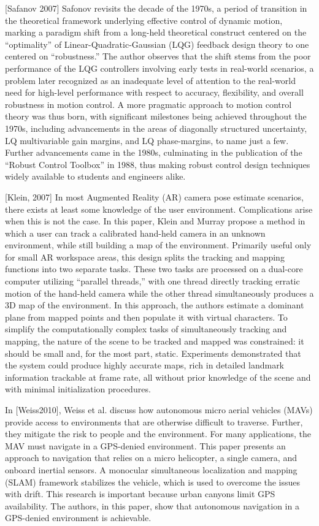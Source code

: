 [Safanov 2007] Safonov revisits the decade of the 1970s, a period of transition in the theoretical framework underlying effective control of dynamic motion, marking a paradigm shift from a long-held theoretical construct centered on the ``optimality'' of Linear-Quadratic-Gaussian (LQG) feedback design theory to one centered on ``robustness.'' The author observes that the shift stems from the poor performance of the LQG controllers involving early tests in real-world scenarios, a problem later recognized as an inadequate level of attention to the real-world need for high-level performance with respect to accuracy, flexibility, and overall robustness in motion control. A more pragmatic approach to motion control theory was thus born, with significant milestones being achieved throughout the 1970s, including advancements in the areas of diagonally structured uncertainty, LQ multivariable gain margins, and LQ phase-margins, to name just a few. Further advancements came in the 1980s, culminating in the publication of the ``Robust Control Toolbox'' in 1988, thus making robust control design techniques widely available to students and engineers alike.

[Klein, 2007] In most Augmented Reality (AR) camera pose estimate scenarios, there exists at least some knowledge of the user environment. Complications arise when this is not the case. In this paper, Klein and Murray propose a method in which a user can track a calibrated hand-held camera in an unknown environment, while still building a map of the environment. Primarily useful only for small AR workspace areas, this design splits the tracking and mapping functions into two separate tasks. These two tasks are processed on a dual-core computer utilizing ``parallel threads,'' with one thread directly tracking erratic motion of the hand-held camera while the other thread simultaneously produces a 3D map of the environment. In this approach, the authors estimate a dominant plane from mapped points and then populate it with virtual characters. To simplify the computationally complex tasks of simultaneously tracking and mapping, the nature of the scene to be tracked and mapped was constrained:  it should be small and, for the most part, static. Experiments demonstrated that the system could produce highly accurate maps, rich in detailed landmark information trackable at frame rate, all without prior knowledge of the scene and with minimal initialization procedures.

In [Weiss2010], Weiss et al. discuss how autonomous micro aerial vehicles (MAVs) provide access to environments that are otherwise difficult to traverse. Further, they mitigate the risk to people and the environment. For many applications, the MAV must navigate in a GPS-denied environment. This paper presents an approach to navigation that relies on a micro helicopter, a single camera, and onboard inertial sensors. A monocular simultaneous localization and mapping (SLAM) framework stabilizes the vehicle, which is used to overcome the issues with drift. This research is important because urban canyons limit GPS availability. The authors, in this paper, show that autonomous navigation in a GPS-denied environment is achievable. 

